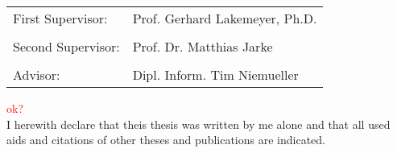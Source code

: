 \newpage
\Large
\begin{tabular}{ l l }
First Supervisor: & Prof. Gerhard Lakemeyer, Ph.D.\\
\\
Second Supervisor: & Prof. Dr. Matthias Jarke\\
\\
Advisor: &  Dipl. Inform. Tim Niemueller\\
\end{tabular}

\vspace{7cm}
\textcolor{red}{ok?}\\
I herewith declare that theis thesis was written by me alone and that all used aids and citations of other theses and publications are indicated.\\

\vspace{3cm}

\large
\makebox[2.5in]{\hrulefill} \hspace {1.0in} \makebox[2.5in]{\hrulefill} \\
 \hspace {1.0in}  \\
\normalsize
